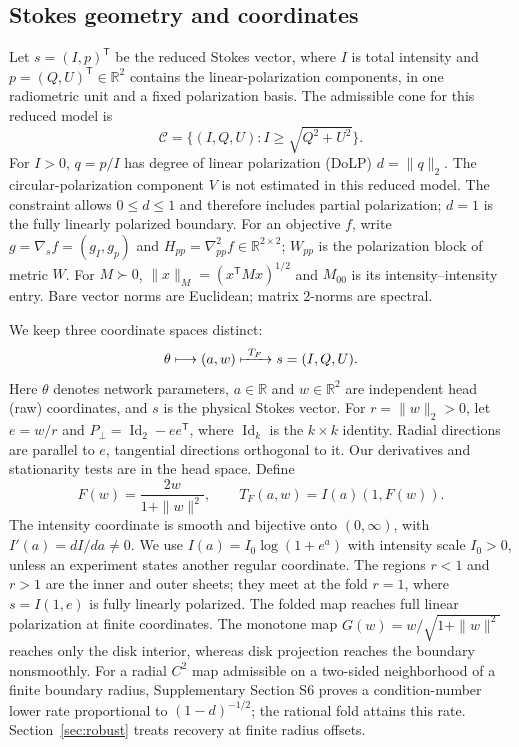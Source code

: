 \documentclass[pdflatex,sn-mathphys-num]{sn-jnl}
\begin{document}
\subsection{Stokes geometry and coordinates}
\label{sec:model}
Let $s=(I,p)^{\mathsf T}$ be the reduced Stokes vector, where $I$ is total intensity and $p=(Q,U)^{\mathsf T}\in\mathbb R^2$ contains the linear-polarization components, in one radiometric unit and a fixed polarization basis. The admissible cone for this reduced model is
\begin{equation}
 \mathcal C=\{(I,Q,U):I\geq\sqrt{Q^2+U^2}\}.
 \label{eq:cone}
\end{equation}
For $I>0$, $q=p/I$ has degree of linear polarization (DoLP) $d=\|q\|_2$. The circular-polarization component $V$ is not estimated in this reduced model. The constraint allows $0\leq d\leq1$ and therefore includes partial polarization; $d=1$ is the fully linearly polarized boundary. For an objective $f$, write $g=\nabla_s f=(g_I,g_p)$ and $H_{pp}=\nabla^2_{pp}f\in\mathbb R^{2\times2}$; $W_{pp}$ is the polarization block of metric $W$. For $M\succ0$, $\|x\|_M=(x^{\mathsf T}Mx)^{1/2}$ and $M_{00}$ is its intensity--intensity entry. Bare vector norms are Euclidean; matrix $2$-norms are spectral.

We keep three coordinate spaces distinct:
\begin{equation}
 \theta\longmapsto(a,w)\xmapsto{\ T_F\ }s=(I,Q,U).
 \label{eq:spaces}
\end{equation}
Here $\theta$ denotes network parameters, $a\in\mathbb R$ and $w\in\mathbb R^2$ are independent head (raw) coordinates, and $s$ is the physical Stokes vector. For $r=\|w\|_2>0$, let $e=w/r$ and $P_\perp=\operatorname{Id}_2-ee^{\mathsf T}$, where $\operatorname{Id}_k$ is the $k\times k$ identity. Radial directions are parallel to $e$, tangential directions orthogonal to it. Our derivatives and stationarity tests are in the head space. Define
\begin{equation}
 F(w)=\frac{2w}{1+\|w\|^2},\qquad
 T_F(a,w)=I(a)(1,F(w)).
 \label{eq:foldmap}
\end{equation}
The intensity coordinate is smooth and bijective onto $(0,\infty)$, with $I'(a)=dI/da\ne0$. We use $I(a)=I_0\log(1+e^a)$ with intensity scale $I_0>0$, unless an experiment states another regular coordinate. The regions $r<1$ and $r>1$ are the inner and outer sheets; they meet at the fold $r=1$, where $s=I(1,e)$ is fully linearly polarized. The folded map reaches full linear polarization at finite coordinates. The monotone map $G(w)=w/\sqrt{1+\|w\|^2}$ reaches only the disk interior, whereas disk projection reaches the boundary nonsmoothly. For a radial $C^2$ map admissible on a two-sided neighborhood of a finite boundary radius, Supplementary Section S6 proves a condition-number lower rate proportional to $(1-d)^{-1/2}$; the rational fold attains this rate. Section~\ref{sec:robust} treats recovery at finite radius offsets.
\end{document}
